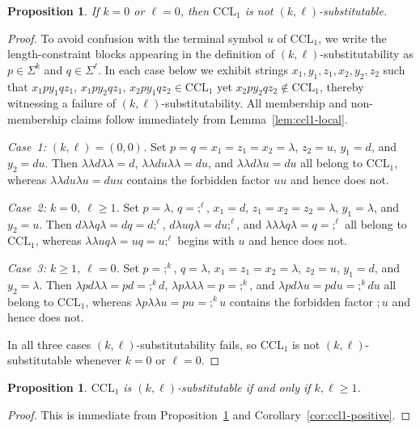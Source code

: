 \documentclass[11pt,a4paper]{article}
\newtheorem{proposition}[theorem]{Proposition}
\begin{document}
\begin{proposition}\label{prop:ccl1-negative}
If $k=0$ or $\ell=0$, then $\mathrm{CCL}_1$ is not $(k,\ell)$-substitutable.
\end{proposition}
\begin{proof}
To avoid confusion with the terminal symbol $u$ of $\mathrm{CCL}_1$,
we write the length-constraint blocks appearing in the definition of
$(k,\ell)$-substitutability as $p\in\Sigma^k$ and $q\in\Sigma^\ell$.
In each case below we exhibit strings $x_1,y_1,z_1,x_2,y_2,z_2$
such that $x_1py_1qz_1$, $x_1py_2qz_1$, $x_2py_1qz_2\in\mathrm{CCL}_1$
yet $x_2py_2qz_2\notin\mathrm{CCL}_1$,
thereby witnessing a failure of $(k,\ell)$-substitutability.
All membership and non-membership claims follow immediately from
Lemma~\ref{lem:ccl1-local}.

\smallskip\noindent\emph{Case~1: $(k,\ell)=(0,0)$.}
Set $p=q=x_1=z_1=x_2=\lambda$, $z_2=u$, $y_1=d$, and $y_2=du$.
Then $\lambda\lambda d\lambda\lambda=d$,
$\lambda\lambda du\lambda\lambda=du$,
and $\lambda\lambda d\lambda u=du$
all belong to $\mathrm{CCL}_1$,
whereas $\lambda\lambda du\lambda u=duu$
contains the forbidden factor $uu$ and hence does not.

\smallskip\noindent\emph{Case~2: $k=0$, $\ell\ge1$.}
Set $p=\lambda$, $q=;^\ell$, $x_1=d$, $z_1=x_2=z_2=\lambda$,
$y_1=\lambda$, and $y_2=u$.
Then $d\lambda\lambda q\lambda=dq=d;^\ell$,
$d\lambda uq\lambda=du;^\ell$,
and $\lambda\lambda\lambda q\lambda=q=;^\ell$
all belong to $\mathrm{CCL}_1$,
whereas $\lambda\lambda u q\lambda=uq=u;^\ell$
begins with $u$ and hence does not.

\smallskip\noindent\emph{Case~3: $k\ge1$, $\ell=0$.}
Set $p=;^k$, $q=\lambda$, $x_1=z_1=x_2=\lambda$, $z_2=u$,
$y_1=d$, and $y_2=\lambda$.
Then $\lambda pd\lambda\lambda=pd=;^kd$,
$\lambda p\lambda\lambda\lambda=p=;^k$,
and $\lambda pd\lambda u=pdu=;^kdu$
all belong to $\mathrm{CCL}_1$,
whereas $\lambda p\lambda\lambda u=pu=;^ku$
contains the forbidden factor $;u$ and hence does not.

\smallskip
In all three cases $(k,\ell)$-substitutability fails,
so $\mathrm{CCL}_1$ is not $(k,\ell)$-substitutable
whenever $k=0$ or $\ell=0$.
\end{proof}
\begin{proposition}\label{prop:ccl1-kl}
$\mathrm{CCL}_1$ is $(k,\ell)$-substitutable if and only if $k,\ell\ge1$.
\end{proposition}

\begin{proof}
This is immediate from Proposition~\ref{prop:ccl1-negative} and Corollary~\ref{cor:ccl1-positive}.
\end{proof}
\end{document}
